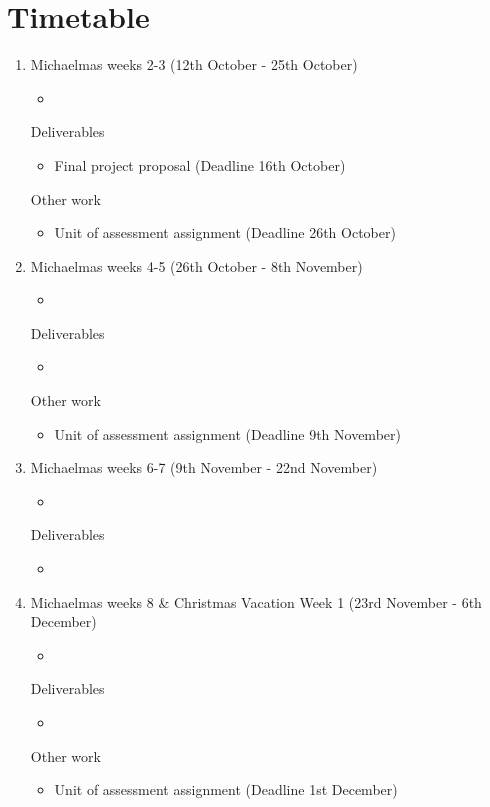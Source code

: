 \documentclass[12pt,a4paper]{article}
\begin{document}
\section*{Timetable}
\begin{enumerate}
    \item Michaelmas weeks 2-3 (12th October - 25th October)
    \begin{itemize}
        \item 
    \end{itemize}
    Deliverables
    \begin{itemize}
        \item Final project proposal (Deadline 16th October)
    \end{itemize}
    Other work
    \begin{itemize}
        \item Unit of assessment assignment (Deadline 26th October)
    \end{itemize}

    \item Michaelmas weeks 4-5 (26th October - 8th November)
    \begin{itemize}
        \item 
    \end{itemize}
    Deliverables
    \begin{itemize}
        \item 
    \end{itemize}
    Other work
    \begin{itemize}
        \item Unit of assessment assignment (Deadline 9th November)
    \end{itemize}

    \item Michaelmas weeks 6-7 (9th November - 22nd November)
    \begin{itemize}
        \item 
    \end{itemize}
    Deliverables
    \begin{itemize}
        \item 
    \end{itemize}

    \item Michaelmas weeks 8 \& Christmas Vacation Week 1 (23rd November - 6th December)
    \begin{itemize}
        \item 
    \end{itemize}
    Deliverables
    \begin{itemize}
        \item 
    \end{itemize}
    Other work
    \begin{itemize}
        \item Unit of assessment assignment (Deadline 1st December)
    \end{itemize}


\end{enumerate}
\end{document}
